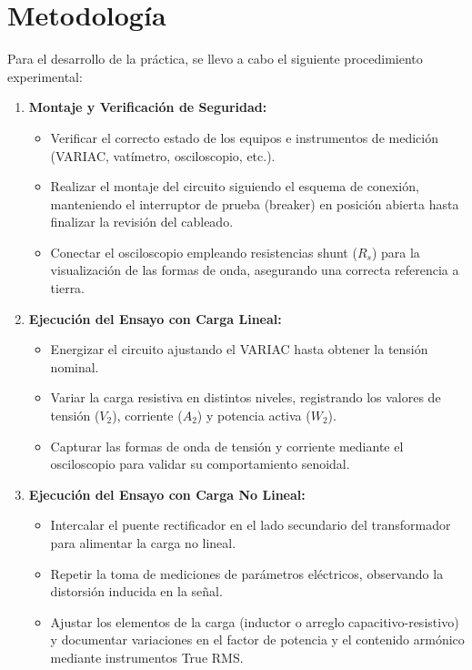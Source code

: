 \section{Metodología}

Para el desarrollo de la práctica, se llevo a cabo el siguiente procedimiento experimental:

\begin{enumerate}
    \item \textbf{Montaje y Verificación de Seguridad:}
    \begin{itemize}
        \item Verificar el correcto estado de los equipos e instrumentos de medición (VARIAC, vatímetro, osciloscopio, etc.).
        \item Realizar el montaje del circuito siguiendo el esquema de conexión, manteniendo el interruptor de prueba (breaker) en posición abierta hasta finalizar la revisión del cableado.
        \item Conectar el osciloscopio empleando resistencias shunt ($R_s$) para la visualización de las formas de onda, asegurando una correcta referencia a tierra.
    \end{itemize}

    \item \textbf{Ejecución del Ensayo con Carga Lineal:}
    \begin{itemize}
        \item Energizar el circuito ajustando el VARIAC hasta obtener la tensión nominal.
        \item Variar la carga resistiva en distintos niveles, registrando los valores de tensión ($V_2$), corriente ($A_2$) y potencia activa ($W_2$).
        \item Capturar las formas de onda de tensión y corriente mediante el osciloscopio para validar su comportamiento senoidal.
    \end{itemize}

    \item \textbf{Ejecución del Ensayo con Carga No Lineal:}
    \begin{itemize}
        \item Intercalar el puente rectificador en el lado secundario del transformador para alimentar la carga no lineal.
        \item Repetir la toma de mediciones de parámetros eléctricos, observando la distorsión inducida en la señal.
        \item Ajustar los elementos de la carga (inductor o arreglo capacitivo-resistivo) y documentar variaciones en el factor de potencia y el contenido armónico mediante instrumentos True RMS.
    \end{itemize}
\end{enumerate}